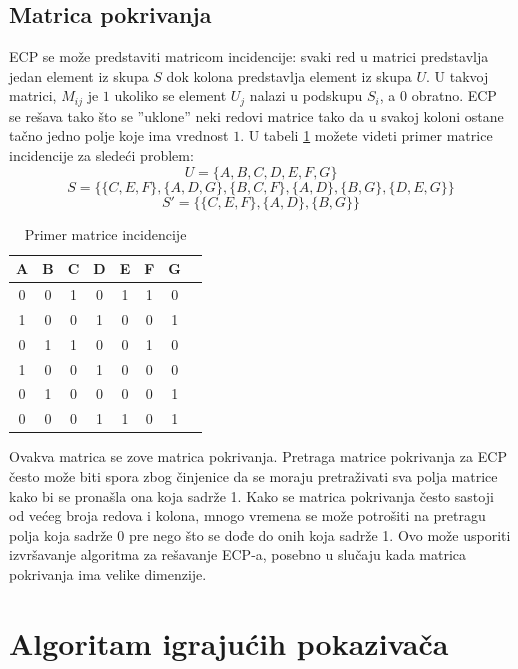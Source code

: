 \documentclass[a4paper]{article}
\begin{document}
{\subsection{Matrica pokrivanja}

ECP se može predstaviti matricom incidencije: svaki red u matrici predstavlja jedan element iz skupa
\( S \) dok kolona predstavlja element iz skupa \( U \). U takvoj matrici, \( M_{ij} \) je \( 1 \)
ukoliko se element \( U_{j} \) nalazi u podskupu \( S_{i} \), a \( 0 \) obratno. ECP se rešava tako
što se ”uklone” neki redovi matrice tako da u svakoj koloni ostane tačno jedno polje koje ima vrednost \( 1 \).
U tabeli \ref{tab:incidencije} možete videti primer matrice incidencije za sledeći problem:\\
$$U = \{A, B, C, D, E, F, G\}$$
$$S = \{\{C, E, F\}, \{A, D, G\}, \{B, C, F\}, \{A, D\}, \{B, G\}, \{D, E, G\}\}$$
$$S' = \{\{C, E, F\}, \{A, D\}, \{B, G\}\}$$
\begin{table}[htbp]
  \centering
  \caption{Primer matrice incidencije}
  \label{tab:incidencije}
  \begin{tabular}{|c|*{7}{c|}}
    \hline
    A & B & C & D & E & F & G \\
    \hline
    \rowcolor{green} 0 & 0 & 1 & 0 & 1 & 1 & 0 \\
    1 & 0 & 0 & 1 & 0 & 0 & 1 \\
    0 & 1 & 1 & 0 & 0 & 1 & 0 \\
    \rowcolor{green} 1 & 0 & 0 & 1 & 0 & 0 & 0 \\
    \rowcolor{green} 0 & 1 & 0 & 0 & 0 & 0 & 1 \\
    0 & 0 & 0 & 1 & 1 & 0 & 1 \\
    \hline
  \end{tabular}
\end{table}

Ovakva matrica se zove matrica pokrivanja. Pretraga matrice pokrivanja za ECP često može biti spora zbog
činjenice da se moraju pretraživati sva polja matrice kako bi se pronašla ona koja sadrže 1. Kako se matrica
pokrivanja često sastoji od većeg broja redova i kolona, mnogo vremena se može potrošiti na pretragu polja
koja sadrže 0 pre nego što se dođe do onih koja sadrže 1. Ovo može usporiti izvršavanje algoritma za rešavanje
ECP-a, posebno u slučaju kada matrica pokrivanja ima velike dimenzije.

\section{Algoritam igrajućih pokazivača}

}
\end{document}
